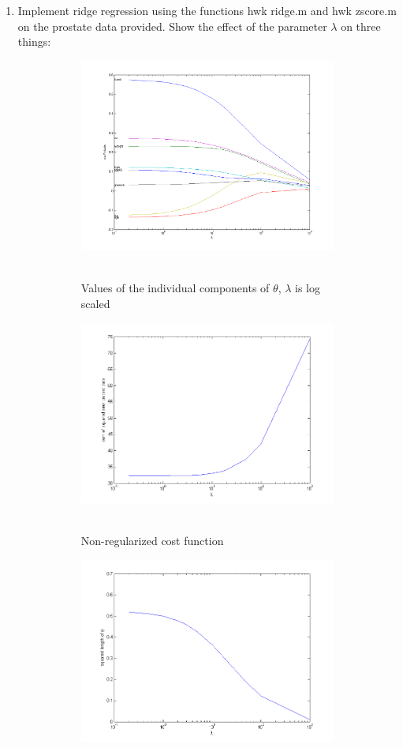 \documentclass{article}
\begin{document}
\begin{enumerate}
		\pagebreak
		\item Implement ridge regression using the functions hwk ridge.m and hwk zscore.m on the prostate data
		provided. Show the effect of the parameter $\lambda$ on three things: 
		\begin{figure}[h]
			\centering
			\begin{subfigure}{.8\textwidth}
				\centering
				\includegraphics[width=.7\linewidth]{ridge_coeff.png}\
				\caption{Values of the individual components of $\theta$, $\lambda$ is log scaled}	
			\end{subfigure}
			\begin{subfigure}{.48\textwidth}
				\centering
				\includegraphics[width=.9\linewidth]{ridge_SLE.png}\
				\caption{Non-regularized cost function}	
			\end{subfigure}
			\begin{subfigure}{.48\textwidth}
				\centering
				\includegraphics[width=.9\linewidth]{ridge_thetaSquared.png}\

\end{subfigure}
\end{figure}
\end{enumerate}
\end{document}
